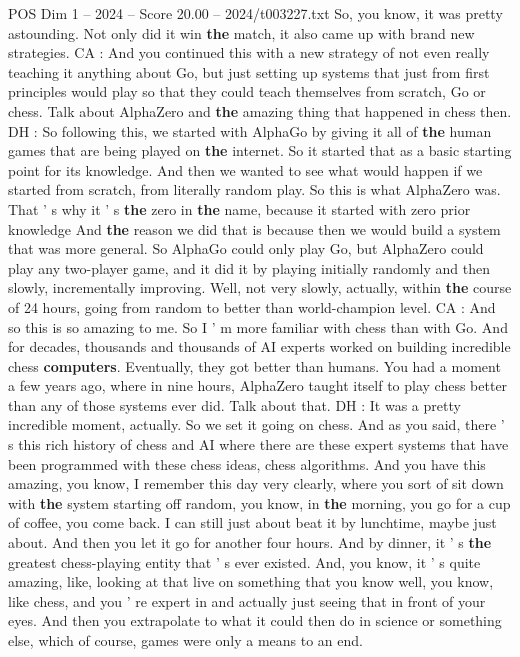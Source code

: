 \begin{textsample}{POS Dim 1 – 2024 – Score 20.00 – 2024/t003227.txt}
So, you know, it was pretty astounding.
Not only did it win \textbf{the} match, it also came up with brand new strategies.
CA : And you continued this with a new strategy of not even really teaching it anything about Go, but just setting up systems that just from first principles would play so that they could teach themselves from scratch, Go or chess.
Talk about AlphaZero and \textbf{the} amazing thing that happened in chess then.
DH : So following this, we started with AlphaGo by giving it all of \textbf{the} human games that are being played on \textbf{the} internet.
So it started that as a basic starting point for its knowledge.
And then we wanted to see what would happen if we started from scratch, from literally random play.
So this is what AlphaZero was.
That ' s why it ' s \textbf{the} zero in \textbf{the} name, because it started with zero prior knowledge And \textbf{the} reason we did that is because then we would build a system that was more general.
So AlphaGo could only play Go, but AlphaZero could play any two-player game, and it did it by playing initially randomly and then slowly, incrementally improving.
Well, not very slowly, actually, within \textbf{the} course of 24 hours, going from random to better than world-champion level.
CA : And so this is so amazing to me.
So I ' m more familiar with chess than with Go.
And for decades, thousands and thousands of AI experts worked on building incredible chess \textbf{computers}.
Eventually, they got better than humans.
You had a moment a few years ago, where in nine hours, AlphaZero taught itself to play chess better than any of those systems ever did.
Talk about that.
DH : It was a pretty incredible moment, actually.
So we set it going on chess.
And as you said, there ' s this rich history of chess and AI where there are these expert systems that have been programmed with these chess ideas, chess algorithms.
And you have this amazing, you know, I remember this day very clearly, where you sort of sit down with \textbf{the} system starting off random, you know, in \textbf{the} morning, you go for a cup of coffee, you come back.
I can still just about beat it by lunchtime, maybe just about.
And then you let it go for another four hours.
And by dinner, it ' s \textbf{the} greatest chess-playing entity that ' s ever existed.
And, you know, it ' s quite amazing, like, looking at that live on something that you know well, you know, like chess, and you ' re expert in and actually just seeing that in front of your eyes.
And then you extrapolate to what it could then do in science or something else, which of course, games were only a means to an end.

\end{textsample}

